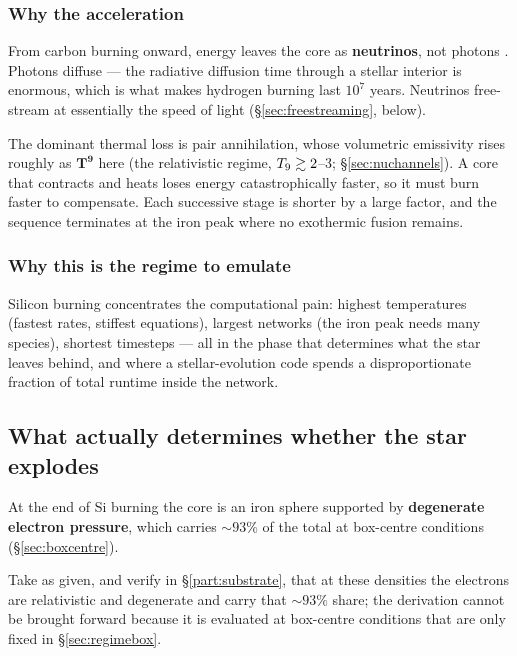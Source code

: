 \subsubsection{Why the acceleration}
\label{sec:acceleration}

From carbon burning onward, energy leaves the core as \textbf{neutrinos}, not
photons \citep{limongi2017,jose2011}. Photons diffuse --- the radiative
diffusion time through a stellar interior is enormous, which is what makes
hydrogen burning last $10^{7}$ years. Neutrinos free-stream at essentially the
speed of light (\S\ref{sec:freestreaming}, below).

The dominant thermal loss is pair annihilation, whose volumetric emissivity
rises roughly as $\boldsymbol{T^{9}}$ here (the relativistic regime,
$T_{9} \gtrsim 2$--3; \S\ref{sec:nuchannels}). A core that contracts and heats
loses energy catastrophically faster, so it must burn faster to compensate.
Each successive stage is shorter by a large factor, and the sequence terminates
at the iron peak where no exothermic fusion remains.

\subsubsection{Why this is the regime to emulate}
\label{sec:whyregime}

Silicon burning concentrates the computational pain: highest temperatures
(fastest rates, stiffest equations), largest networks (the iron peak needs many
species), shortest timesteps --- all in the phase that determines what the star
leaves behind, and where a stellar-evolution code spends a disproportionate
fraction of total runtime inside the network.

\subsection{What actually determines whether the star explodes}
\label{sec:explodability}

At the end of Si burning the core is an iron sphere supported by
\textbf{degenerate electron pressure}, which carries ${\sim}93\%$ of the total
at box-centre conditions (\S\ref{sec:boxcentre}).

Take as given, and verify in \S\ref{part:substrate}, that at these
densities the electrons are relativistic and degenerate and carry that
${\sim}93\%$ share; the derivation cannot be brought forward because it is
evaluated at box-centre conditions that are only fixed in
\S\ref{sec:regimebox}.

